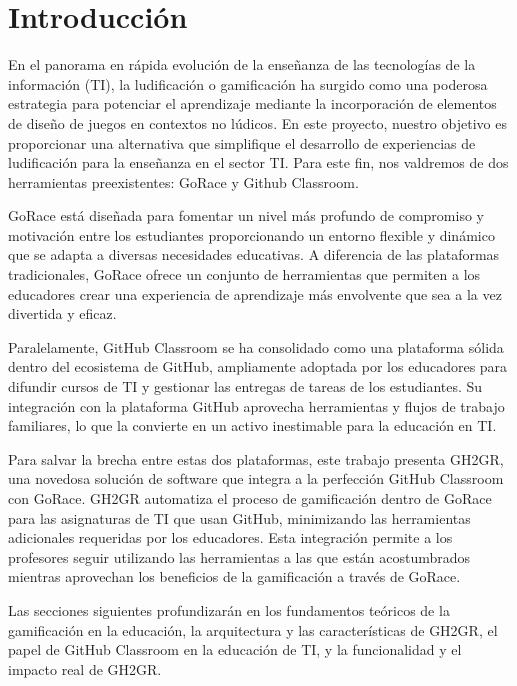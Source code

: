 \setlength{\parskip}{1em}

\section{Introducción}
En el panorama en rápida evolución de la enseñanza de las tecnologías de la información (\acrshort{TI}), la ludificación o gamificación ha surgido como una poderosa estrategia para potenciar el aprendizaje mediante la incorporación de elementos de diseño de juegos en contextos no lúdicos\cite{10.1145/3231709}. En este proyecto, nuestro objetivo es proporcionar una alternativa que simplifique el desarrollo de experiencias de ludificación para la enseñanza en el sector \acrshort{TI}. Para este fin, nos valdremos de dos herramientas preexistentes: GoRace y Github Classroom.

GoRace está diseñada para fomentar un nivel más profundo de compromiso y motivación entre los estudiantes proporcionando un entorno flexible y dinámico que se adapta a diversas necesidades educativas. A diferencia de las plataformas tradicionales, GoRace ofrece un conjunto de herramientas que permiten a los educadores crear una experiencia de aprendizaje más envolvente que sea a la vez divertida y eficaz.

Paralelamente, GitHub Classroom se ha consolidado como una plataforma sólida dentro del ecosistema de GitHub, ampliamente adoptada por los educadores para difundir cursos de \acrshort{TI} y gestionar las entregas de tareas de los estudiantes. Su integración con la plataforma GitHub aprovecha herramientas y flujos de trabajo familiares, lo que la convierte en un activo inestimable para la educación en \acrshort{TI}.

Para salvar la brecha entre estas dos plataformas, este trabajo presenta GH2GR, una novedosa solución de software que integra a la perfección GitHub Classroom con GoRace. GH2GR automatiza el proceso de gamificación dentro de GoRace para las asignaturas de \acrshort{TI} que usan GitHub, minimizando las herramientas adicionales requeridas por los educadores. Esta integración permite a los profesores seguir utilizando las herramientas a las que están acostumbrados mientras aprovechan los beneficios de la gamificación a través de GoRace.

Las secciones siguientes profundizarán en los fundamentos teóricos de la gamificación en la educación, la arquitectura y las características de GH2GR, el papel de GitHub Classroom en la educación de \acrshort{TI}, y la funcionalidad y el impacto real de GH2GR.

